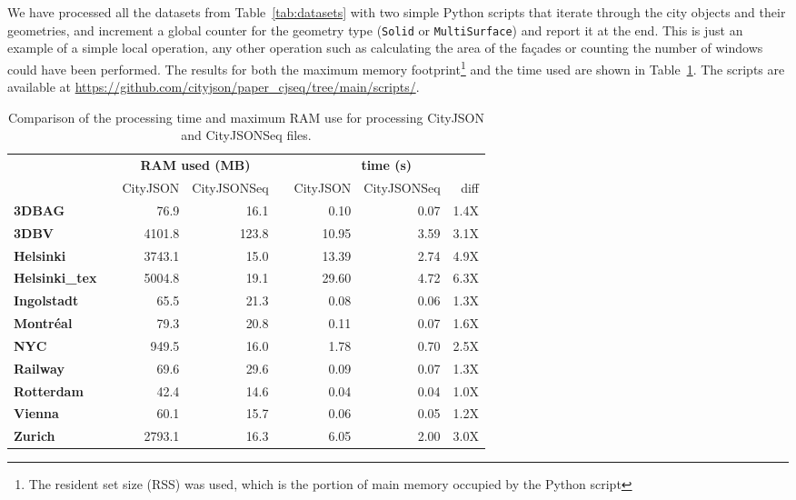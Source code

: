 \documentclass{isprs} %
\begin{document}
We have processed all the datasets from Table~\ref{tab:datasets} with two simple Python scripts that iterate through the city objects and their geometries, and increment a global counter for the geometry type (\texttt{Solid} or \texttt{MultiSurface}) and report it at the end.
This is just an example of a simple local operation, any other operation such as calculating the area of the façades or counting the number of windows could have been performed.
The results for both the maximum memory footprint\footnote{The resident set size (RSS) was used, which is the portion of main memory occupied by the Python script} and the time used are shown in Table~\ref{tab:ramtime}.
The scripts are available at \url{https://github.com/cityjson/paper_cjseq/tree/main/scripts/}.
\begin{table}
  \centering
  \caption{Comparison of the processing time and maximum RAM use for processing CityJSON and CityJSONSeq files.}
  \small
  \begin{tabular}
    {@{}lcrrcrrr@{}}\toprule
    &&  \multicolumn{2}{c}{\textbf{RAM used (MB)}} && \multicolumn{3}{c}{\textbf{time (s)}} \\ 
    \cmidrule{3-4} \cmidrule{6-8} 
     && CityJSON & CityJSONSeq && CityJSON & CityJSONSeq & diff \\
    \midrule
     \textbf{3DBAG}         &&   76.9 &  16.1  &&   0.10 & 0.07 & 1.4X \\
     \textbf{3DBV}          && 4101.8 & 123.8  &&  10.95 & 3.59 & 3.1X \\
     \textbf{Helsinki}      && 3743.1 &  15.0  &&  13.39 & 2.74 & 4.9X \\
     \textbf{Helsinki\_tex} && 5004.8 &  19.1  &&  29.60 & 4.72 & 6.3X \\
     \textbf{Ingolstadt}    &&   65.5 &  21.3  &&   0.08 & 0.06 & 1.3X \\
     \textbf{Montréal}      &&   79.3 &  20.8  &&   0.11 & 0.07 & 1.6X \\
     \textbf{NYC}           &&  949.5 &  16.0  &&   1.78 & 0.70 & 2.5X \\
     \textbf{Railway}       &&   69.6 &  29.6  &&   0.09 & 0.07 & 1.3X \\
     \textbf{Rotterdam}     &&   42.4 &  14.6  &&   0.04 & 0.04 & 1.0X \\
     \textbf{Vienna}        &&   60.1 &  15.7  &&   0.06 & 0.05 & 1.2X \\
     \textbf{Zurich}        && 2793.1 &  16.3  &&   6.05 & 2.00 & 3.0X \\
    \bottomrule
  \end{tabular}%
  \label{tab:ramtime}
\end{table}
\end{document}
